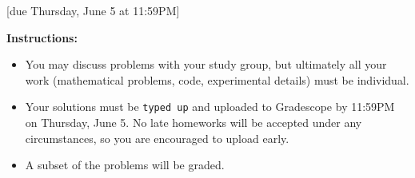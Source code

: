 \documentclass{article}
\begin{document}
[due Thursday, June 5 at 11:59PM]

\textbf{Instructions:}
\begin{itemize}
    \item You may discuss problems with your study group, but ultimately all your work (mathematical problems, code, experimental details) must be individual.
    \item Your solutions must be \texttt{typed up} and uploaded to Gradescope by 11:59PM on Thursday, June 5. No late homeworks will be accepted under any circumstances, so you are encouraged to upload early.
    \item A subset of the problems will be graded.
\end{itemize}

\vspace{1em}
{}
\end{document}
